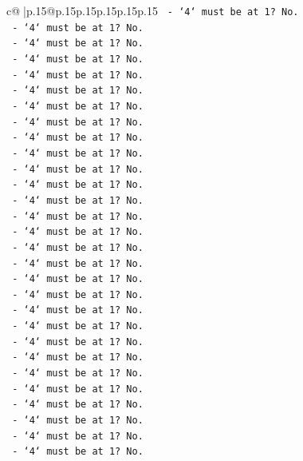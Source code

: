 \documentclass{article}
\begin{document}
{\begin{supertabular}{c@{$\;$}|p{.15\linewidth}@{}p{.15\linewidth}p{.15\linewidth}p{.15\linewidth}p{.15\linewidth}p{.15\linewidth}}
{{{\texttt{            {-} `4` must be at 1? No.} \\
\texttt{            {-} `4` must be at 1? No.} \\
\texttt{            {-} `4` must be at 1? No.} \\
\texttt{            {-} `4` must be at 1? No.} \\
\texttt{            {-} `4` must be at 1? No.} \\
\texttt{            {-} `4` must be at 1? No.} \\
\texttt{            {-} `4` must be at 1? No.} \\
\texttt{            {-} `4` must be at 1? No.} \\
\texttt{            {-} `4` must be at 1? No.} \\
\texttt{            {-} `4` must be at 1? No.} \\
\texttt{            {-} `4` must be at 1? No.} \\
\texttt{            {-} `4` must be at 1? No.} \\
\texttt{            {-} `4` must be at 1? No.} \\
\texttt{            {-} `4` must be at 1? No.} \\
\texttt{            {-} `4` must be at 1? No.} \\
\texttt{            {-} `4` must be at 1? No.} \\
\texttt{            {-} `4` must be at 1? No.} \\
\texttt{            {-} `4` must be at 1? No.} \\
\texttt{            {-} `4` must be at 1? No.} \\
\texttt{            {-} `4` must be at 1? No.} \\
\texttt{            {-} `4` must be at 1? No.} \\
\texttt{            {-} `4` must be at 1? No.} \\
\texttt{            {-} `4` must be at 1? No.} \\
\texttt{            {-} `4` must be at 1? No.} \\
\texttt{            {-} `4` must be at 1? No.} \\
\texttt{            {-} `4` must be at 1? No.} \\
\texttt{            {-} `4` must be at 1? No.} \\
\texttt{            {-} `4` must be at 1? No.} \\
\texttt{            {-} `4` must be at 1? No.} \\
}}}
\end{supertabular}}
\end{document}
